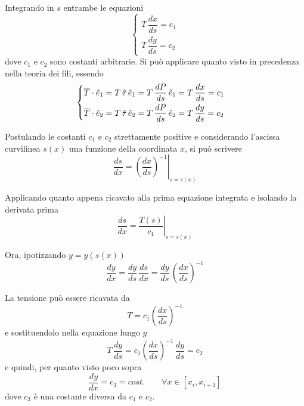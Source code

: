 Integrando in $s$ entrambe le equazioni
\[
\begin{cases} 
T\,\dfrac{dx}{ds} = c_1\\[1.5ex]
  T\,\dfrac{dy}{ds} = c_2
\end{cases}
\]
dove $c_1$ e $c_2$ sono costanti arbitrarie. Si può applicare quanto visto in precedenza nella teoria dei fili, essendo
\[
\begin{cases}
\overline{T}\cdot\hat{e}_1 = T\,\hat{\tau}\,\hat{e}_1 = T\,\dfrac{dP}{ds}\,\hat{e}_1 = T\,\dfrac{dx}{ds} = c_1\\[1.5ex]
\overline{T}\cdot\hat{e}_2 = T\,\hat{\tau}\,\hat{e}_2 = T\,\dfrac{dP}{ds}\,\hat{e}_2 = T\,\dfrac{dy}{ds} = c_2
\end{cases}
\]

Postulando le costanti $c_1$ e $c_2$ strettamente positive e considerando l'ascissa curvilinea $s(x)$ una funzione della coordinata $x$, si può scrivere
\[
\dfrac{ds}{dx} = \left.\left(\dfrac{dx}{ds}\right)^{-1}\right|_{s = s(x)} 
\]

Applicando quanto appena ricavato alla prima equazione integrata e isolando la derivata prima
\[
\dfrac{ds}{dx} = \left.\dfrac{T(s)}{c_1}\right|_{s = s(x)}
\]

Ora, ipotizzando $y = y(s(x))$
\[
\dfrac{dy}{dx} = \dfrac{dy}{ds}\,\dfrac{ds}{dx} = \dfrac{dy}{ds}\,\left(\dfrac{dx}{ds}\right)^{-1}
\]

La tensione può essere ricavata da
\[
T = c_1\left(\dfrac{dx}{ds}\right)^{-1}
\]
e sostituendolo nella equazione lungo $y$
\[
T\,\dfrac{dy}{ds} = c_1\left(\dfrac{dx}{ds}\right)^{-1}\,\dfrac{dy}{ds} = c_2
\]
e quindi, per quanto visto poco sopra
\begin{equation}
\label{eq:tratto_filo_costante}
\dfrac{dy}{dx} = c_3 = cost.\qquad \forall x\in[x_i, x_{i+1}]
\end{equation}
dove $c_3$ è una costante diversa da $c_1$ e $c_2$.

